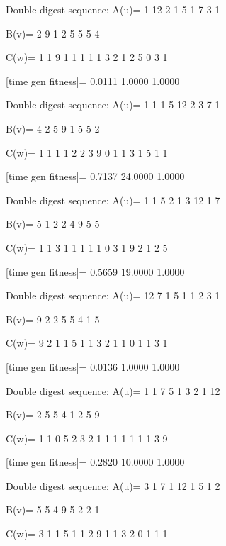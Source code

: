Double digest sequence:
A(u)=
     1    12     2     1     5     1     7     3     1

B(v)=
     2     9     1     2     5     5     5     4

C(w)=
     1     1     9     1     1     1     1     1     3     2     1     2     5     0     3     1

[time gen fitness]=
    0.0111    1.0000    1.0000

Double digest sequence:
A(u)=
     1     1     1     5    12     2     3     7     1

B(v)=
     4     2     5     9     1     5     5     2

C(w)=
     1     1     1     1     2     2     3     9     0     1     1     3     1     5     1     1

[time gen fitness]=
    0.7137   24.0000    1.0000

Double digest sequence:
A(u)=
     1     1     5     2     1     3    12     1     7

B(v)=
     5     1     2     2     4     9     5     5

C(w)=
     1     1     3     1     1     1     1     1     0     3     1     9     2     1     2     5

[time gen fitness]=
    0.5659   19.0000    1.0000

Double digest sequence:
A(u)=
    12     7     1     5     1     1     2     3     1

B(v)=
     9     2     2     5     5     4     1     5

C(w)=
     9     2     1     1     5     1     1     3     2     1     1     0     1     1     3     1

[time gen fitness]=
    0.0136    1.0000    1.0000

Double digest sequence:
A(u)=
     1     1     7     5     1     3     2     1    12

B(v)=
     2     5     5     4     1     2     5     9

C(w)=
     1     1     0     5     2     3     2     1     1     1     1     1     1     1     3     9

[time gen fitness]=
    0.2820   10.0000    1.0000

Double digest sequence:
A(u)=
     3     1     7     1    12     1     5     1     2

B(v)=
     5     5     4     9     5     2     2     1

C(w)=
     3     1     1     5     1     1     2     9     1     1     3     2     0     1     1     1


